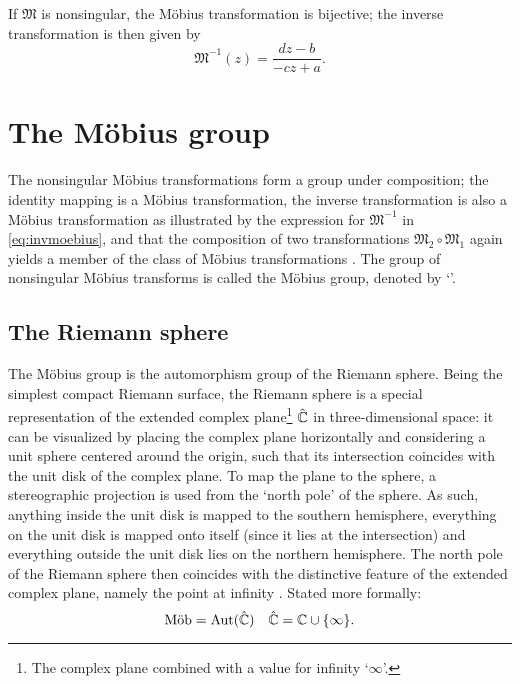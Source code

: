 If \(\mathfrak{M}\) is nonsingular, the Möbius transformation is bijective; the inverse transformation is then given by \cite{Needham1997}
\begin{equation}
    \mathfrak{M}^{-1}(z) = \frac{dz - b}{-cz + a}.
    \label{eq:invmoebius}
\end{equation}

\section{The Möbius group}
The nonsingular Möbius transformations form a group under composition; the identity mapping is a Möbius transformation, the inverse transformation is also a Möbius transformation as illustrated by the expression for \(\mathfrak{M}^{-1}\) in \cref{eq:invmoebius}, and that the composition of two transformations \(\mathfrak{M}_2 \circ \mathfrak{M}_1\) again yields a member of the class of Möbius transformations \cite{Needham1997}. The group of nonsingular Möbius transforms is called the Möbius group, denoted by `\moebiusgroup'.

\subsection{The Riemann sphere}
The Möbius group \moebiusgroup is the automorphism group of the Riemann sphere. Being the simplest compact Riemann surface, the Riemann sphere is a special representation of the extended complex plane\footnote{The complex plane combined with a value for infinity `\(\infty\)'.} \(\hat{\complex}\) in three-dimensional space: it can be visualized by placing the complex plane horizontally and considering a unit sphere centered around the origin, such that its intersection coincides with the unit disk of the complex plane. To map the plane to the sphere, a stereographic projection is used from the `north pole' of the sphere. As such, anything inside the unit disk is mapped to the southern hemisphere, everything on the unit disk is mapped onto itself (since it lies at the intersection) and everything outside the unit disk lies on the northern hemisphere. The north pole of the Riemann sphere then coincides with the distinctive feature of the extended complex plane, namely the point at infinity \cite{Needham1997}. Stated more formally:
\[ \moebiusgroup = \automorphgroup{\hat{\complex}} \quad \hat{\complex} = \complex \cup \{\infty\}.\]

